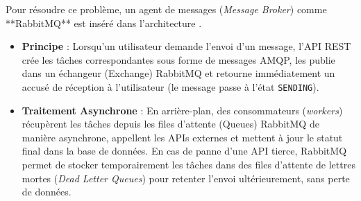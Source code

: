 Pour résoudre ce problème, un agent de messages (\textit{Message Broker}) comme **RabbitMQ** est inséré dans l'architecture \cite{rabbitmqconf}. 
\begin{itemize}
    \item \textbf{Principe} : Lorsqu'un utilisateur demande l'envoi d'un message, l'API REST crée les tâches correspondantes sous forme de messages AMQP, les publie dans un échangeur (Exchange) RabbitMQ et retourne immédiatement un accusé de réception à l'utilisateur (le message passe à l'état \texttt{SENDING}).
    \item \textbf{Traitement Asynchrone} : En arrière-plan, des consommateurs (\textit{workers}) récupèrent les tâches depuis les files d'attente (Queues) RabbitMQ de manière asynchrone, appellent les APIs externes et mettent à jour le statut final dans la base de données. En cas de panne d'une API tierce, RabbitMQ permet de stocker temporairement les tâches dans des files d'attente de lettres mortes (\textit{Dead Letter Queues}) pour retenter l'envoi ultérieurement, sans perte de données.
\end{itemize}
